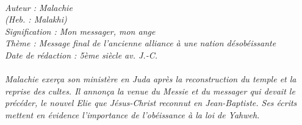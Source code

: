 \BFont
\noindent\hrulefill
{\footnotesize
\textit{
\bigskip
{\centering{}
\\Auteur : Malachie
\\(Heb. : Malakhi)
\\Signification : Mon messager, mon ange
\\Thème : Message final de l'ancienne alliance à une nation désobéissante
\\Date de rédaction : 5ème siècle av. J.-C.\\}
}
\textit{
\\Malachie exerça son ministère en Juda après la reconstruction du temple et la reprise des cultes. Il annonça la venue du Messie et du messager qui devait le précéder, le nouvel Elie que Jésus-Christ reconnut en Jean-Baptiste. Ses écrits mettent en évidence l’importance de l’obéissance à la loi de Yahweh.\bigskip
}
}
\par\nobreak\noindent\hrulefill
